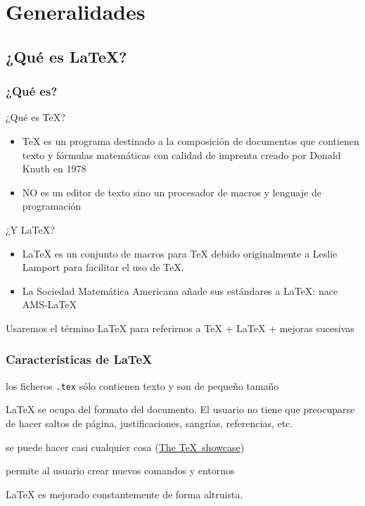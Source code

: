 \documentclass[10pt,xcolor=svgnames]{beamer}
\begin{document}
\section{Generalidades}

\subsection{¿Qué es \LaTeX?}

\begin{frame}
  \frametitle{¿Qué es?}
  \begin{block}{¿Qué es \TeX?}
    \begin{itemize}
      \item \TeX{} es un programa destinado a la composición de documentos que contienen texto y fórmulas matemáticas con calidad de imprenta creado por Donald Knuth en 1978
      \item NO es un editor de texto sino un procesador de macros y lenguaje de programación
    \end{itemize}
  \end{block}
  \begin{block}{¿Y \LaTeX?}
    \begin{itemize}
      \item \LaTeX{} es un conjunto de macros para \TeX{}  debido originalmente a Leslie Lamport para facilitar el uso de \TeX.
      \item La Sociedad Matemática Americana añade sus estándares a \LaTeX{}: nace AMS-\LaTeX
    \end{itemize}
  \end{block}

  Usaremos el término \alert{\LaTeX{}} para referirnos a \TeX{} + \LaTeX{} + mejoras sucesivas
\end{frame}




\begin{frame}
  \frametitle{Características de \LaTeX}
  \begin{description}[Transportabiilidad]
    \addtolength\itemsep{\fill}
  \item[Transportable] los ficheros \texttt{.tex} sólo contienen texto y son de pequeño tamaño 
  \item[Estructurado] \LaTeX{} se ocupa del formato del documento. El usuario no tiene que preocuparse de hacer saltos de página, justificaciones, sangrías, referencias, etc.
  \item[Versátil] se puede hacer casi cualquier cosa (\href{https://www.tug.org/texshowcase/}{The \TeX\ showcase})
  \item[Flexible] permite al usuario crear nuevos comandos y entornos 
  \item[Actualizado] \LaTeX{} es mejorado constantemente de forma altruista.
\end{description}
\end{frame}
\end{document}
